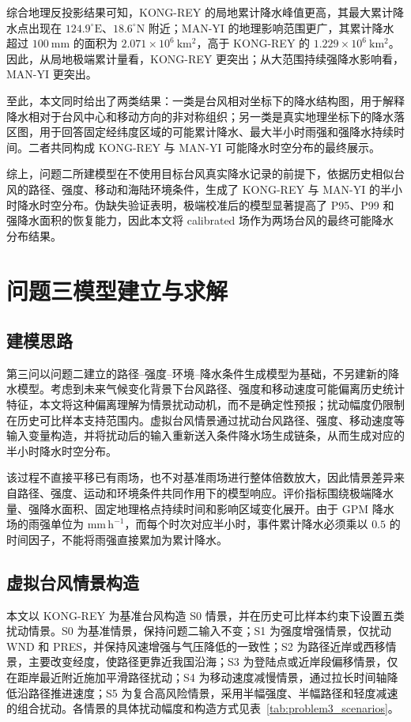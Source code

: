\documentclass[UTF8,a4paper,zihao=5,fontset=fandol]{ctexart}
\numberwithin{equation}{section}
\numberwithin{figure}{section}
\numberwithin{table}{section}
\begin{document}
综合地理反投影结果可知，KONG-REY 的局地累计降水峰值更高，其最大累计降水点出现在 $124.9^\circ\mathrm{E}$、$18.6^\circ\mathrm{N}$ 附近；MAN-YI 的地理影响范围更广，其累计降水超过 $100\ \mathrm{mm}$ 的面积为 $2.071\times 10^6\ \mathrm{km^2}$，高于 KONG-REY 的 $1.229\times 10^6\ \mathrm{km^2}$。因此，从局地极端累计量看，KONG-REY 更突出；从大范围持续强降水影响看，MAN-YI 更突出。

至此，本文同时给出了两类结果：一类是台风相对坐标下的降水结构图，用于解释降水相对于台风中心和移动方向的非对称组织；另一类是真实地理坐标下的降水落区图，用于回答固定经纬度区域的可能累计降水、最大半小时雨强和强降水持续时间。二者共同构成 KONG-REY 与 MAN-YI 可能降水时空分布的最终展示。

综上，问题二所建模型在不使用目标台风真实降水记录的前提下，依据历史相似台风的路径、强度、移动和海陆环境条件，生成了 KONG-REY 与 MAN-YI 的半小时降水时空分布。伪缺失验证表明，极端校准后的模型显著提高了 P95、P99 和强降水面积的恢复能力，因此本文将 calibrated 场作为两场台风的最终可能降水分布结果。

\section{问题三模型建立与求解}

\subsection{建模思路}

第三问以问题二建立的路径--强度--环境--降水条件生成模型为基础，不另建新的降水模型。考虑到未来气候变化背景下台风路径、强度和移动速度可能偏离历史统计特征，本文将这种偏离理解为情景扰动动机，而不是确定性预报；扰动幅度仍限制在历史可比样本支持范围内。虚拟台风情景通过扰动台风路径、强度、移动速度等输入变量构造，并将扰动后的输入重新送入条件降水场生成链条，从而生成对应的半小时降水时空分布。

该过程不直接平移已有雨场，也不对基准雨场进行整体倍数放大，因此情景差异来自路径、强度、运动和环境条件共同作用下的模型响应。评价指标围绕极端降水量、强降水面积、固定地理格点持续时间和影响区域变化展开。由于 GPM 降水场的雨强单位为 $\mathrm{mm\,h^{-1}}$，而每个时次对应半小时，事件累计降水必须乘以 $0.5$ 的时间因子，不能将雨强直接累加为累计降水。

\subsection{虚拟台风情景构造}

本文以 KONG-REY 为基准台风构造 S0 情景，并在历史可比样本约束下设置五类扰动情景。S0 为基准情景，保持问题二输入不变；S1 为强度增强情景，仅扰动 WND 和 PRES，并保持风速增强与气压降低的一致性；S2 为路径近岸或西移情景，主要改变经度，使路径更靠近我国沿海；S3 为登陆点或近岸段偏移情景，仅在距岸最近附近施加平滑路径扰动；S4 为移动速度减慢情景，通过拉长时间轴降低沿路径推进速度；S5 为复合高风险情景，采用半幅强度、半幅路径和轻度减速的组合扰动。各情景的具体扰动幅度和构造方式见表~\ref{tab:problem3_scenarios}。
\end{document}
